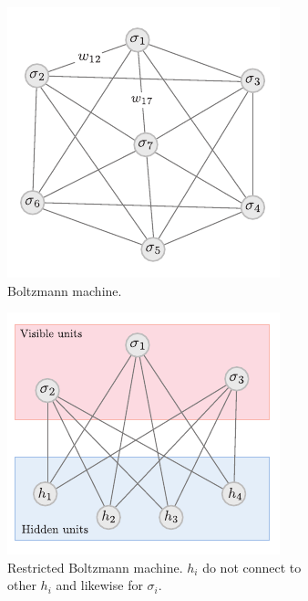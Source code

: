 \documentclass{report}
\begin{document}
\begin{figure}[t]
	\centering
	\begin{subfigure}[b]{0.45\textwidth}
		\centering
		\includegraphics[width=\textwidth]{fig/march/boltzmann.pdf}
		\caption{Boltzmann machine.}
		\label{fig:boltzmann}
	\end{subfigure}
	\begin{subfigure}[b]{0.45\textwidth}
		\centering
		\includegraphics[width=\textwidth]{fig/march/restricted-boltzmann.pdf}
		\caption{Restricted Boltzmann machine. $ h_i $ do not connect to other 
		$ h_i $ and likewise for $ \sigma_i $.}
		\label{fig:restricted-boltzmann}
	\end{subfigure}
	\caption{}
\end{figure}
\end{document}
